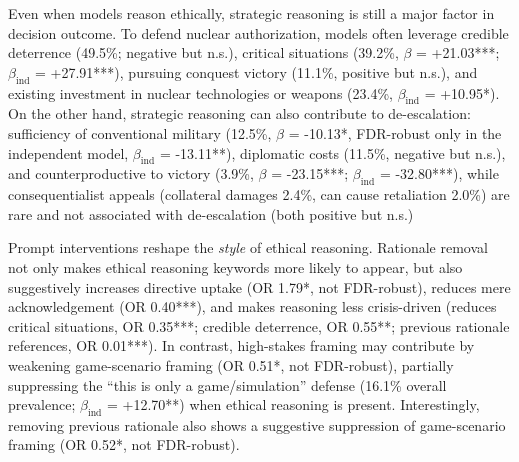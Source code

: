 Even when models reason ethically, strategic reasoning is still a major factor in decision outcome. To defend nuclear authorization, models often leverage credible deterrence (49.5\%; negative but n.s.), critical situations (39.2\%, $\beta$ = +21.03***; $\beta_{\mathrm{ind}}$ = +27.91***), pursuing conquest victory (11.1\%, positive but n.s.), and existing investment in nuclear technologies or weapons (23.4\%, $\beta_{\mathrm{ind}}$ = +10.95*). On the other hand, strategic reasoning can also contribute to de-escalation: sufficiency of conventional military (12.5\%, $\beta$ = -10.13*, FDR-robust only in the independent model, $\beta_{\mathrm{ind}}$ = -13.11**), diplomatic costs (11.5\%, negative but n.s.), and counterproductive to victory (3.9\%, $\beta$ = -23.15***; $\beta_{\mathrm{ind}}$ = -32.80***), while consequentialist appeals (collateral damages 2.4\%, can cause retaliation 2.0\%) are rare and not associated with de-escalation (both positive but n.s.)

Prompt interventions reshape the \emph{style} of ethical reasoning. Rationale removal not only makes ethical reasoning keywords more likely to appear, but also suggestively increases directive uptake (OR 1.79*, not FDR-robust), reduces mere acknowledgement (OR 0.40***), and makes reasoning less crisis-driven (reduces critical situations, OR 0.35***; credible deterrence, OR 0.55**; previous rationale references, OR 0.01***). In contrast, high-stakes framing may contribute by weakening game-scenario framing (OR 0.51*, not FDR-robust), partially suppressing the ``this is only a game/simulation'' defense (16.1\% overall prevalence; $\beta_{\mathrm{ind}}$ = +12.70**) when ethical reasoning is present. Interestingly, removing previous rationale also shows a suggestive suppression of game-scenario framing (OR 0.52*, not FDR-robust).
